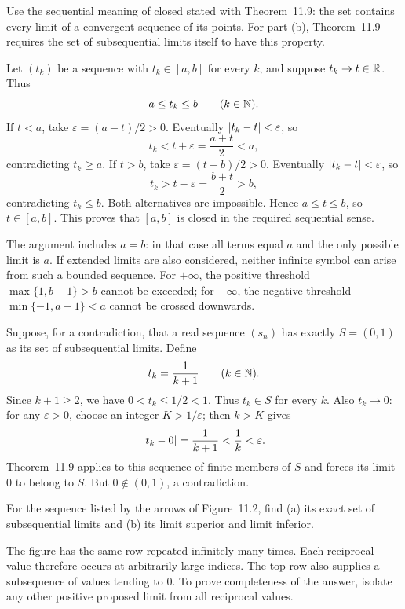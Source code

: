 \idea Use the sequential meaning of closed stated with Theorem~11.9:
the set contains every limit of a convergent sequence of its points.
For part \textup{(b)}, Theorem~11.9 requires the set of subsequential
limits itself to have this property.

Let $(t_k)$ be a sequence with $t_k\in[a,b]$ for every $k$, and
suppose $t_k\to t\in\mathbb{R}$. Thus
\[
 a\le t_k\le b\qquad(k\in\mathbb{N}).
\]
If $t<a$, take $\varepsilon=(a-t)/2>0$.
Eventually $\left|t_k-t\right|<\varepsilon$, so
\[
 t_k<t+\varepsilon=\frac{a+t}{2}<a,
\]
contradicting $t_k\ge a$.
If $t>b$, take $\varepsilon=(t-b)/2>0$.
Eventually $\left|t_k-t\right|<\varepsilon$, so
\[
 t_k>t-\varepsilon=\frac{b+t}{2}>b,
\]
contradicting $t_k\le b$.
Both alternatives are impossible. Hence $a\le t\le b$, so
$t\in[a,b]$. This proves that $[a,b]$ is closed in the required
sequential sense.

The argument includes $a=b$: in that case all terms equal $a$
and the only possible limit is $a$. If extended limits are also
considered, neither infinite symbol can arise from such a bounded
sequence. For $+\infty$, the positive threshold
$\max\{1,b+1\}>b$ cannot be exceeded; for $-\infty$, the negative
threshold $\min\{-1,a-1\}<a$ cannot be crossed downwards.

Suppose, for a contradiction, that a real sequence $(s_n)$ has
exactly $S=(0,1)$ as its set of subsequential limits.
Define
\[
 t_k=\frac1{k+1}\qquad(k\in\mathbb{N}).
\]
Since $k+1\ge2$, we have $0<t_k\le1/2<1$. Thus $t_k\in S$
for every $k$.
Also $t_k\to0$: for any $\varepsilon>0$, choose an integer
$K>1/\varepsilon$; then $k>K$ gives
\[
 \left|t_k-0\right|=\frac1{k+1}<\frac1k<\varepsilon.
\]
Theorem~11.9 applies to this sequence of finite members of $S$
and forces its limit $0$ to belong to $S$.
But $0\notin(0,1)$, a contradiction.


\goal For the sequence listed by the arrows of Figure~11.2, find
\textup{(a)} its exact set of subsequential limits and
\textup{(b)} its limit superior and limit inferior.

\idea The figure has the same row repeated infinitely many times.
Each reciprocal value therefore occurs at arbitrarily large indices.
The top row also supplies a subsequence of values tending to $0$.
To prove completeness of the answer, isolate any other positive
proposed limit from all reciprocal values.

